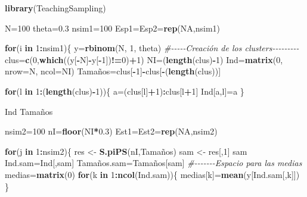 \documentclass[
  spanish,
  12pt,
]{book}
\newenvironment{Shaded}{\begin{snugshade}}{\end{snugshade}}
\newcommand{\AttributeTok}[1]{\textcolor[rgb]{0.13,0.29,0.53}{#1}}
\newcommand{\CommentTok}[1]{\textcolor[rgb]{0.56,0.35,0.01}{\textit{#1}}}
\newcommand{\ConstantTok}[1]{\textcolor[rgb]{0.56,0.35,0.01}{#1}}
\newcommand{\ControlFlowTok}[1]{\textcolor[rgb]{0.13,0.29,0.53}{\textbf{#1}}}
\newcommand{\DecValTok}[1]{\textcolor[rgb]{0.00,0.00,0.81}{#1}}
\newcommand{\FloatTok}[1]{\textcolor[rgb]{0.00,0.00,0.81}{#1}}
\newcommand{\FunctionTok}[1]{\textcolor[rgb]{0.13,0.29,0.53}{\textbf{#1}}}
\newcommand{\NormalTok}[1]{#1}
\newcommand{\OtherTok}[1]{\textcolor[rgb]{0.56,0.35,0.01}{#1}}
\newcommand{\SpecialCharTok}[1]{\textcolor[rgb]{0.81,0.36,0.00}{\textbf{#1}}}
\begin{document}
\begin{Shaded}
\begin{Highlighting}[]
\FunctionTok{library}\NormalTok{(TeachingSampling)}

\NormalTok{N}\OtherTok{=}\DecValTok{100}
\NormalTok{theta}\OtherTok{=}\FloatTok{0.3}
\NormalTok{nsim1}\OtherTok{=}\DecValTok{100}
\NormalTok{Esp1}\OtherTok{=}\NormalTok{Esp2}\OtherTok{=}\FunctionTok{rep}\NormalTok{(}\ConstantTok{NA}\NormalTok{,nsim1)}

\ControlFlowTok{for}\NormalTok{(i }\ControlFlowTok{in} \DecValTok{1}\SpecialCharTok{:}\NormalTok{nsim1)\{}
\NormalTok{y}\OtherTok{=}\FunctionTok{rbinom}\NormalTok{(N, }\DecValTok{1}\NormalTok{, theta)}
\CommentTok{\#{-}{-}{-}{-}{-}Creación de los clusters{-}{-}{-}{-}{-}{-}{-}{-}{-}}
\NormalTok{clus}\OtherTok{=}\FunctionTok{c}\NormalTok{(}\DecValTok{0}\NormalTok{,}\FunctionTok{which}\NormalTok{((y[}\SpecialCharTok{{-}}\NormalTok{N]}\SpecialCharTok{{-}}\NormalTok{y[}\SpecialCharTok{{-}}\DecValTok{1}\NormalTok{])}\SpecialCharTok{!=}\DecValTok{0}\NormalTok{)}\SpecialCharTok{+}\DecValTok{1}\NormalTok{)}
\NormalTok{NI}\OtherTok{=}\NormalTok{(}\FunctionTok{length}\NormalTok{(clus)}\SpecialCharTok{{-}}\DecValTok{1}\NormalTok{)}
\NormalTok{Ind}\OtherTok{=}\FunctionTok{matrix}\NormalTok{(}\DecValTok{0}\NormalTok{, }\AttributeTok{nrow=}\NormalTok{N, }\AttributeTok{ncol=}\NormalTok{NI)}
\NormalTok{Tamaños}\OtherTok{=}\NormalTok{clus[}\SpecialCharTok{{-}}\DecValTok{1}\NormalTok{]}\SpecialCharTok{{-}}\NormalTok{clus[}\SpecialCharTok{{-}}\NormalTok{(}\FunctionTok{length}\NormalTok{(clus))]}

\ControlFlowTok{for}\NormalTok{(l }\ControlFlowTok{in} \DecValTok{1}\SpecialCharTok{:}\NormalTok{(}\FunctionTok{length}\NormalTok{(clus)}\SpecialCharTok{{-}}\DecValTok{1}\NormalTok{))\{}
\NormalTok{a}\OtherTok{=}\NormalTok{(clus[l]}\SpecialCharTok{+}\DecValTok{1}\NormalTok{)}\SpecialCharTok{:}\NormalTok{clus[l}\SpecialCharTok{+}\DecValTok{1}\NormalTok{]}
\NormalTok{Ind[a,l]}\OtherTok{=}\NormalTok{a}
\NormalTok{\}}

\NormalTok{Ind}
\NormalTok{Tamaños}

\NormalTok{nsim2}\OtherTok{=}\DecValTok{100}
\NormalTok{nI}\OtherTok{=}\FunctionTok{floor}\NormalTok{(NI}\SpecialCharTok{*}\FloatTok{0.3}\NormalTok{)}
\NormalTok{Est1}\OtherTok{=}\NormalTok{Est2}\OtherTok{=}\FunctionTok{rep}\NormalTok{(}\ConstantTok{NA}\NormalTok{,nsim2)}

\ControlFlowTok{for}\NormalTok{(j }\ControlFlowTok{in} \DecValTok{1}\SpecialCharTok{:}\NormalTok{nsim2)\{}
\NormalTok{res }\OtherTok{\textless{}{-}} \FunctionTok{S.piPS}\NormalTok{(nI,Tamaños)}
\NormalTok{sam }\OtherTok{\textless{}{-}}\NormalTok{ res[,}\DecValTok{1}\NormalTok{] }
\NormalTok{sam}
\NormalTok{Ind.sam}\OtherTok{=}\NormalTok{Ind[,sam]}
\NormalTok{Tamaños.sam}\OtherTok{=}\NormalTok{Tamaños[sam]}
\CommentTok{\#{-}{-}{-}{-}{-}{-}{-}Espacio para las medias}
\NormalTok{medias}\OtherTok{=}\FunctionTok{matrix}\NormalTok{(}\DecValTok{0}\NormalTok{)}
\ControlFlowTok{for}\NormalTok{(k }\ControlFlowTok{in} \DecValTok{1}\SpecialCharTok{:}\FunctionTok{ncol}\NormalTok{(Ind.sam))\{}
\NormalTok{medias[k]}\OtherTok{=}\FunctionTok{mean}\NormalTok{(y[Ind.sam[,k]])}
\NormalTok{\}}


\end{Highlighting}
\end{Shaded}
\end{document}
